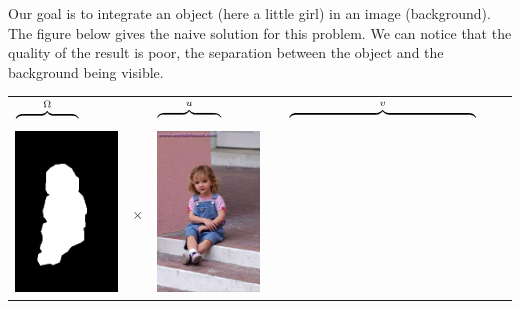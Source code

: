 \documentclass[a4paper]{article}
\begin{document}
  Our goal is to integrate an object (here a little girl) in an image (background). The figure below gives the naive solution for this problem. We can notice that the quality of the result is poor, the separation between the object and the background being visible.

  \bigskip
  \begin{tabular}{m{1.6cm}m{.6cm}m{1.6cm}m{.6cm}m{4.7cm}m{.6cm}m{4.7cm}}
    $\overbrace{\hspace{1.6cm}}^{\Omega}$ &&
    $\overbrace{\hspace{1.6cm}}^u$ &&
    $\overbrace{\hspace{4.7cm}}^v$ \\
    \includegraphics[scale=.2]{results_poisson/foreground-mask.png}
    & {\Huge$\times$} &
    \includegraphics[scale=.2]{results_poisson/foreground.png}

\end{tabular}
\end{document}
